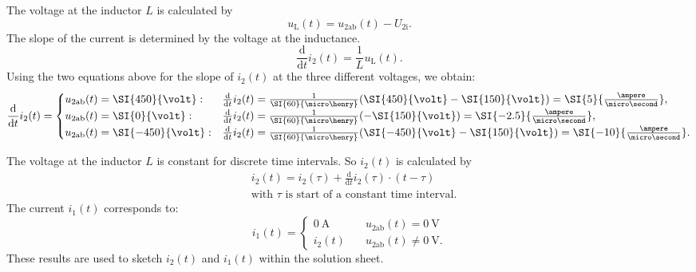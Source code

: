 \begin{solutionblock}
    The voltage at the inductor $L$ is calculated by
    \begin{equation*}
        u_\mathrm{L}(t) = u_\mathrm{2ab}(t)-U_\mathrm{2i}.
        \label{eq:u_inductor}
    \end{equation*}
    The slope of the current is determined by the voltage at the inductance.
    \begin{equation*}
        \frac{\mathrm{d}}{\mathrm{d}t}i_\mathrm{2}(t) = \frac{1}{L}u_\mathrm{L}(t).
        \label{eq:i2_slope_gen}
    \end{equation*}
    Using the two equations above for the slope of $i_\mathrm{2}(t)$ at the three different voltages, we obtain:
    \begin{equation*}
        \frac{\mathrm{d}}{\mathrm{d}t}i_\mathrm{2}(t) =
        \begin{cases}
            u_\mathrm{2ab}(t)=\SI{450}{\volt}:  &\frac{\mathrm{d}}{\mathrm{d}t}i_\mathrm{2}(t)
            =\frac{1}{\SI{60}{\micro\henry}}(\SI{450}{\volt}-\SI{150}{\volt})=\SI{5}{\frac{\ampere}{\micro\second}}, \\
            u_\mathrm{2ab}(t)=\SI{0}{\volt}:  &\frac{\mathrm{d}}{\mathrm{d}t}i_\mathrm{2}(t)
            =\frac{1}{\SI{60}{\micro\henry}}(-\SI{150}{\volt})=\SI{-2.5}{\frac{\ampere}{\micro\second}}, \\
            u_\mathrm{2ab}(t)=\SI{-450}{\volt}: &\frac{\mathrm{d}}{\mathrm{d}t}i_\mathrm{2}(t)
            =\frac{1}{\SI{60}{\micro\henry}}(\SI{-450}{\volt}-\SI{150}{\volt})=\SI{-10}{\frac{\ampere}{\micro\second}}.
        \end{cases}
        \label{eq:i2_slope_res}
    \end{equation*}

    The voltage at the inductor $L$ is constant for discrete time intervals. So $i_\mathrm{2}(t)$ is calculated by
    \begin{equation*}
        \begin{aligned}        
            &i_\mathrm{2}(t) = i_\mathrm{2}(\tau)+\frac{\mathrm{d}}{\mathrm{d}t}i_\mathrm{2}(\tau) \cdot (t-\tau) \\
            &\text{with $\tau$ is start of a constant time interval.}
        \end{aligned}
        \label{eq:i2_res}
    \end{equation*}
    The current $i_\mathrm{1}(t)$ corresponds to:
    \begin{equation*}
        i_\mathrm{1}(t) =
        \begin{cases}
            \SI{0}{\ampere} \quad &u_\mathrm{2ab}(t) = \SI{0}{\volt} \\
            i_\mathrm{2}(t) \quad &u_\mathrm{2ab}(t) \neq \SI{0}{\volt}.
        \end{cases}        
    \end{equation*}    
    These results are used to sketch $i_\mathrm{2}(t)$ and $i_\mathrm{1}(t)$ within the solution sheet.    

\end{solutionblock}

